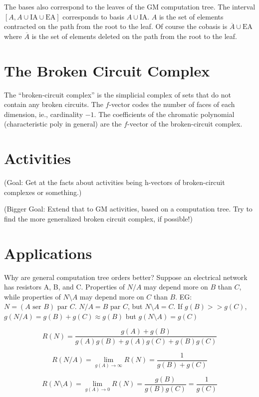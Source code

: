 \documentclass{article}
\begin{document}
\begin{enumerate}
The bases also correspond to the leaves of the GM computation tree.
The interval $[A,A\cup \text{IA}\cup\text{EA}]$ corresponds to basis
$A\cup\text{IA}$.  $A$ is the set of elements contracted on the path from the 
root to the leaf.  Of course the cobasis is $\overline{A}\cup\text{EA}$ where
$\overline{A}$ is the set of elements deleted on the path from the root to the 
leaf.



\section{The Broken Circuit Complex}

\cite{BrokenCctComplexBryl}

The ``broken-circuit complex'' is the simplicial complex of sets that do not contain
any broken circuits.  The $f$-vector codes the number of faces of each dimension, ie., 
cardinality $-1$.
The coefficients of the chromatic polynomial (characteristic poly in general)
are the $f$-vector of the broken-circuit complex.

\section{Activities}

(Goal: Get at the facts about activities being h-vectors of broken-circuit complexes or 
something.)

(Bigger Goal: Extend that to GM activities, based on a computation tree.  Try to find 
the more generalized broken circuit complex, if possible!)

\section{Applications}

Why are general computation tree orders better?  Suppose an electrical network has resistors
A, B, and C.  Properties of $N/A$ may depend more on $B$ than $C$, while properties of
$N\setminus A$ may depend more on $C$ than $B$. EG: $N=(A \text{ ser } B) \text{ par } C$.
$N/A = B \text{ par } C$, but $N\setminus A = C$.  If $g(B) >> g(C)$, 
$g(N/A) = g(B) + g(C) \approx g(B)$
but $g(N\setminus A) = g(C)$ 

\[
R(N) = \frac{g(A)+g(B)}{g(A)g(B)+g(A)g(C)+g(B)g(C)}
\]

\[
R(N/A) = \lim_{g(A)\rightarrow\infty}R(N) = \frac{1}{g(B)+g(C)}
\]

\[
R(N\setminus A) = \lim_{g(A)\rightarrow 0}R(N) = \frac{g(B)}{g(B)g(C)} = \frac{1}{g(C)}
\]








\end{enumerate}
\end{document}
